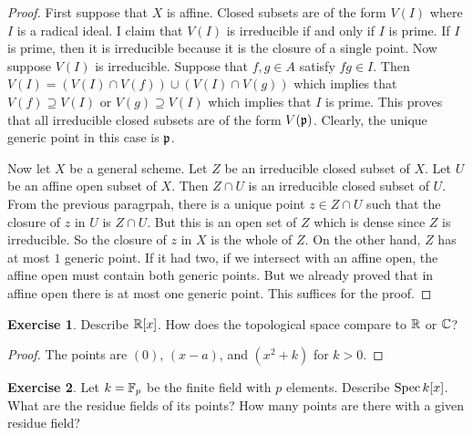 \documentclass[]{pcmi}
\theoremstyle{plain}
\theoremstyle{definition}
\newtheorem{Exercise}{Exercise}
\theoremstyle{remark}
\begin{document}
\begin{proof}
    First suppose that $X$ is affine. Closed subsets are of the form $V(I)$ where $I$ is a radical ideal. I claim that $V(I)$ is irreducible if and only if $I$ is prime. If $I$ is prime, then it is irreducible because it is the closure of a single point. Now suppose $V(I)$ is irreducible. Suppose that $f, g \in A$ satisfy $fg \in I$. Then $V(I) = (V(I) \cap V(f)) \cup (V(I) \cap V(g))$ which implies that $V(f) \supseteq V(I)$ or $V(g) \supseteq V(I)$ which implies that $I$ is prime. This proves that all irreducible closed subsets are of the form $V(\mathfrak{p})$. Clearly, the unique generic point in this case is $\mathfrak{p}$.

    Now let $X$ be a general scheme. Let $Z$ be an irreducible closed subset of $X$. Let $U$ be an affine open subset of $X$. Then $Z \cap U$ is an irreducible closed subset of $U$. From the previous paragrpah, there is a unique point $z \in Z \cap U$ such that the closure of $z$ in $U$ is $Z \cap U$. But this is an open set of $Z$ which is dense since $Z$ is irreducible. So the closure of $z$ in $X$ is the whole of $Z$. On the other hand, $Z$ has at most $1$ generic point. If it had two, if we intersect with an affine open, the affine open must contain both generic points. But we already proved that in affine open there is at most one generic point. This suffices for the proof. 
\end{proof}

\begin{Exercise}
    Describe $\mathbb{R}[x]$. How does the topological space compare to $\mathbb{R}$ or $\mathbb{C}$? 
\end{Exercise}

\begin{proof}
    The points are $(0)$, $(x-a)$, and $(x^2 + k)$ for $k > 0$. 
\end{proof}

\begin{Exercise}
    Let $k = \mathbb{F}_p$ be the finite field with $p$ elements. Describe $\operatorname{Spec} k[x]$. What are the residue fields of its points? How many points are there with a given residue field? 
\end{Exercise}
\end{document}
